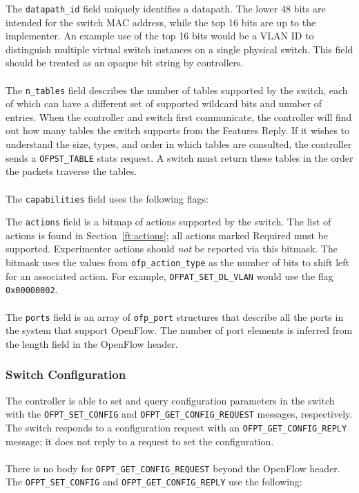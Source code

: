 
The \verb|datapath_id| field uniquely identifies a datapath.  The lower 48 bits are intended for the switch MAC address, while the top 16 bits are up to the implementer.  An example use of the top 16 bits would be a VLAN ID to distinguish multiple virtual switch instances on a single physical switch.  This field should be treated as an opaque bit string by controllers.
\\\\
The \verb|n_tables| field describes the number of tables supported by the switch, each of which can have a different set of supported wildcard bits and number of entries.  When the controller and switch first communicate, the controller will find out how many tables the switch supports from the Features Reply. If it wishes to understand the size, types, and order in which tables are consulted, the controller sends a \verb|OFPST_TABLE| stats request. A switch must return these tables in the order the packets traverse the tables.
\\\\
The \verb|capabilities| field uses the following flags:

 
The \verb|actions| field is a bitmap of actions supported by the switch.  The list of actions is found in Section~\ref{ft:actions}; all actions marked Required must be supported. Experimenter actions should \emph{not} be reported via this bitmask. The bitmask uses the values from \verb|ofp_action_type| as the number of bits to shift left for an associated action. For example, \verb|OFPAT_SET_DL_VLAN| would use the flag \verb|0x00000002|.
\\\\
The \verb|ports| field is an array of \verb|ofp_port| structures that describe all the ports in the system that support OpenFlow.  The number of port elements is inferred from the length field in the OpenFlow header. 

\subsubsection{Switch Configuration}
The controller is able to set and query configuration parameters in the switch with the \verb|OFPT_SET_CONFIG| and \verb|OFPT_GET_CONFIG_REQUEST| messages, respectively.  The switch responds to a configuration request with an \verb|OFPT_GET_CONFIG_REPLY| message; it does not reply to a request to set the configuration.  
\\\\
There is no body for \verb|OFPT_GET_CONFIG_REQUEST| beyond the OpenFlow header.  The \verb|OFPT_SET_CONFIG| and \verb|OFPT_GET_CONFIG_REPLY| use the following:

